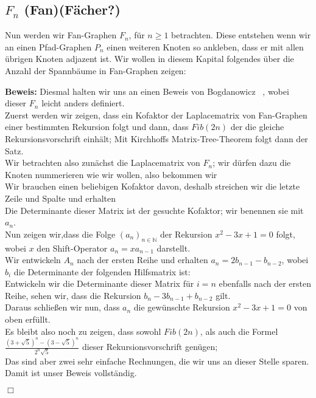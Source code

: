 \subsection{$F_n$ (Fan)(Fächer?)}
Nun werden wir Fan-Graphen $F_n$, für $n \geq 1$ betrachten. Diese entstehen wenn wir an einen Pfad-Graphen $P_{n}$ einen weiteren Knoten so ankleben, dass er mit allen übrigen Knoten adjazent ist. 
Wir wollen in diesem Kapital folgendes über die Anzahl der Spannbäume in Fan-Graphen zeigen:
\begin{Tms}
 \label{ThmFn}
\end{Tms}
\textbf{Beweis:}
Diesmal halten wir uns an einen Beweis von Bogdanowicz ~\cite{bogdanowicz_2008}, wobei dieser $F_n$ leicht anders definiert.\\
Zuerst werden wir zeigen, dass ein Kofaktor der Laplacematrix von Fan-Graphen einer bestimmten Rekursion folgt und dann, dass $Fib(2n)$ der die gleiche Rekursionsvorschrift einhält; Mit Kirchhoffs Matrix-Tree-Theorem folgt dann der Satz.\\
Wir betrachten also zunächst die Laplacematrix von $F_n$; wir dürfen dazu die Knoten nummerieren wie wir wollen, also bekommen wir\\
Wir brauchen einen beliebigen Kofaktor davon, deshalb streichen wir die letzte Zeile und Spalte und erhalten\\
Die Determinante dieser Matrix ist der gesuchte Kofaktor; wir benennen sie mit $a_n$.\\
Nun zeigen wir,dass die Folge $(a_n)_{n \in \mathbb{N}}$ der Rekursion $x^2-3x+1=0$ folgt, \\wobei $x$ den Shift-Operator $a_n = xa_{n-1}$ darstellt. \\
Wir entwickeln $A_n$ nach der ersten Reihe und erhalten $a_n = 2b_{n-1} - b_{n-2}$, wobei $b_i$ die Determinante der folgenden Hilfsmatrix ist:\\
Entwickeln wir die Determinante dieser Matrix für $i=n$ ebenfalls nach der ersten Reihe, sehen wir, dass die Rekursion $b_n-3b_{n-1} + b_{n-2}$ gilt.\\
Daraus schließen wir nun, dass $a_n$ die gewünschte Rekursion $x^2-3x+1=0$ von oben erfüllt.\\
Es bleibt also noch zu zeigen, dass sowohl $Fib(2n)$, als auch die Formel $\frac{(3+\sqrt{5})^{n}-(3-\sqrt{5})^{n}}{2^{n}\sqrt{5}}$ dieser Rekursionsvorschrift genügen;\\ 
Das sind aber zwei sehr einfache Rechnungen, die wir uns an dieser Stelle sparen.\\
Damit ist unser Beweis vollständig.\\
\begin{flushright} $\Box$ \end{flushright} 
